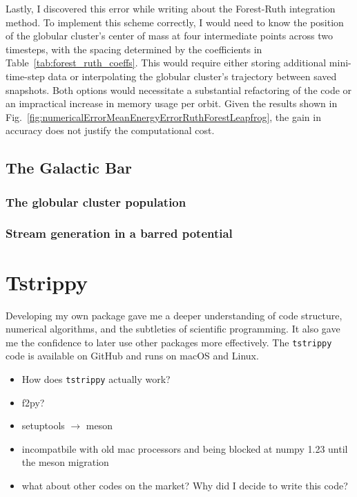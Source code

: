         Lastly, I discovered this error while writing about the Forest-Ruth integration method. To implement this scheme correctly, I would need to know the position of the globular cluster's center of mass at four intermediate points across two timesteps, with the spacing determined by the coefficients in Table~\ref{tab:forest_ruth_coeffs}. This would require either storing additional mini-time-step data or interpolating the globular cluster's trajectory between saved snapshots. Both options would necessitate a substantial refactoring of the code or an impractical increase in memory usage per orbit. Given the results shown in Fig.~\ref{fig:numericalErrorMeanEnergyErrorRuthForestLeapfrog}, the gain in accuracy does not justify the computational cost.

    \subsection{The Galactic Bar}

        \subsubsection{The globular cluster population}


        \subsubsection{Stream generation in a barred potential}


\section{Tstrippy}

    Developing my own package gave me a deeper understanding of code structure, numerical algorithms, and the subtleties of scientific programming. It also gave me the confidence to later use other packages more effectively. The \texttt{tstrippy} code is available on GitHub and runs on macOS and Linux.

    \begin{itemize}
        \item How does \texttt{tstrippy} actually work?
        \item f2py? 
        \item setuptools $\rightarrow$ meson 
        \item incompatbile with old mac processors and being blocked at numpy 1.23 until the meson migration 
        \item what about other codes on the market? Why did I decide to write this code? 
    \end{itemize}

